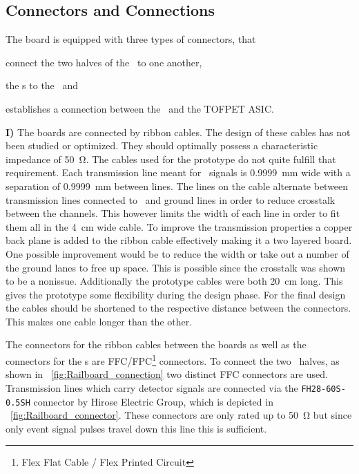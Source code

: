 \documentclass[../BTOF_summary.tex]{subfiles}
\begin{document}
\subsection{Connectors and Connections}

The board is equipped with three types of connectors, that 
\begin{enumerate*}[label=\textbf{\Roman*})]
	\item  connect the two halves of the \railboard\ to one another, 
	\item the \sensorboard s to the \railboard\ and 
	\item establishes a connection between the \railboard\ and the TOFPET ASIC.
\end{enumerate*}

\textbf{I)} 
The boards are connected by ribbon cables.
The design of these cables has not been studied or optimized.
They should optimally possess a characteristic impedance of \SI{50}{\ohm}.
The cables used for the prototype do not quite fulfill that requirement.
Each transmission line meant for \sipm\ signals is \SI{0.9999}{mm} wide with a separation of \SI{0.9999}{mm} between lines.
The lines on the cable alternate between transmission lines connected to \sipms\ and ground lines in order to reduce crosstalk between the channels.
This however limits the width of each line in order to fit them all in the \SI{4}{cm} wide cable.
To improve the transmission properties a copper back plane is added to the ribbon cable effectively making it a two layered board.
One possible improvement would be to reduce the width or take out a number of the ground lanes to free up space.
This is possible since the crosstalk was shown to be a nonissue.
Additionally the prototype cables were both \SI{20}{cm} long.
This gives the prototype some flexibility during the design phase.
For the final design the cables should be shortened to the respective distance between the connectors.
This makes one cable longer than the other.

The connectors for the ribbon cables between the boards as well as the connectors for the \sensorboard s are FFC/FPC\footnote{Flex Flat Cable / Flex Printed Circuit} connectors.
To connect the two \railboard\ halves, as shown in \fig ~\ref{fig:Railboard_connection} two distinct FFC connectors are used.
Transmission lines which carry detector signals are connected via the \texttt{FH28-60S-0.5SH} connector by Hirose Electric Group, which is depicted in \fig~\ref{fig:Railboard_connector}.
These connectors are only rated up to \SI{50}{\ohm} but since only event signal pulses travel down this line this is sufficient.
\end{document}
